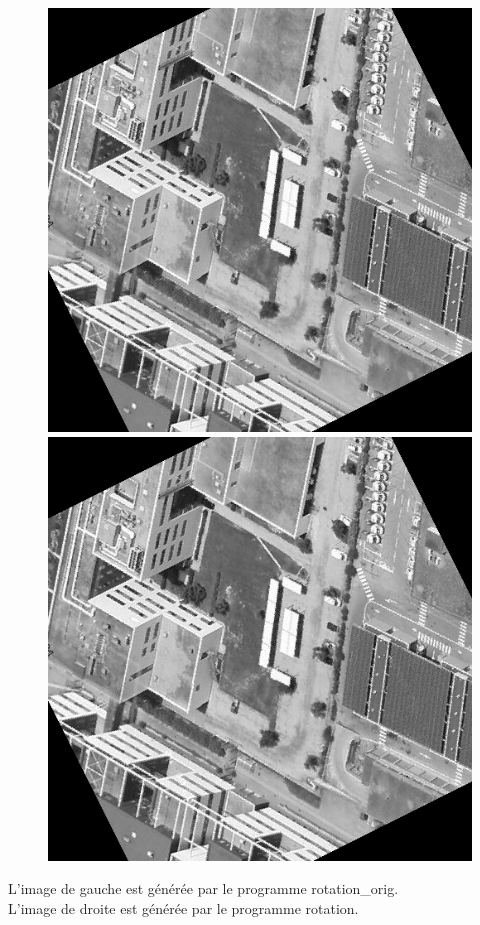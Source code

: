 \documentclass[11pt,a4paper]{article}
\begin{document}
\begin{figure}[h]
	\centering
	\includegraphics[scale=0.3]{../img/Q8_output_orig.png}
	\includegraphics[scale=0.3]{../img/Q8_output.png}
\end{figure}
\begin{center}
L'image de gauche est générée par le programme rotation\_orig.\\
L'image de droite est générée par le programme rotation.
\end{center}
\end{document}

